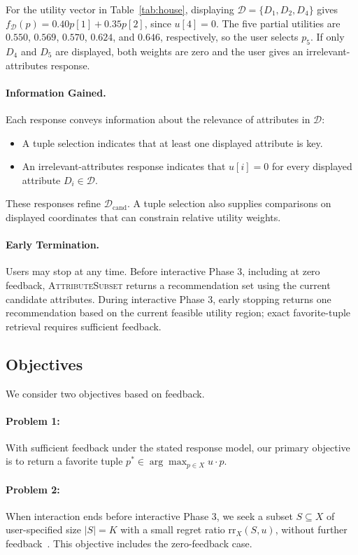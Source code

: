 For the utility vector in Table~\ref{tab:house}, displaying $\mathcal{D}=\{D_1,D_2,D_4\}$ gives $f_\mathcal{D}(p)=0.40p[1]+0.35p[2]$, since $u[4]=0$. The five partial utilities are $0.550$, $0.569$, $0.570$, $0.624$, and $0.646$, respectively, so the user selects $p_5$. If only $D_4$ and $D_5$ are displayed, both weights are zero and the user gives an irrelevant-attributes response.

\paragraph{Information Gained.}
Each response conveys information about the relevance of attributes in $\mathcal{D}$:
\begin{itemize}
    \item A tuple selection indicates that at least one displayed attribute is key.
    \item An irrelevant-attributes response indicates that $u[i]=0$ for every displayed attribute $D_i\in\mathcal{D}$.
\end{itemize}
These responses refine $\mathcal{D}_\text{cand}$. A tuple selection also supplies comparisons on displayed coordinates that can constrain relative utility weights.

\paragraph{Early Termination.}
Users may stop at any time. Before interactive Phase 3, including at zero feedback, \textsc{AttributeSubset} returns a recommendation set using the current candidate attributes. During interactive Phase 3, early stopping returns one recommendation based on the current feasible utility region; exact favorite-tuple retrieval requires sufficient feedback.

\subsection{Objectives}

We consider two objectives based on feedback.

\paragraph{Problem 1: }\label{p1}
With sufficient feedback under the stated response model, our primary objective is to return a favorite tuple $p^*\in\arg\max_{p\in X}u\cdot p$.

\paragraph{Problem 2: }\label{p2}
When interaction ends before interactive Phase 3, we seek a subset $S\subseteq X$ of user-specified size $\lvert S\rvert=K$ with a small regret ratio $\mathrm{rr}_X(S,u)$, without further feedback~\cite{NS10}. This objective includes the zero-feedback case.

